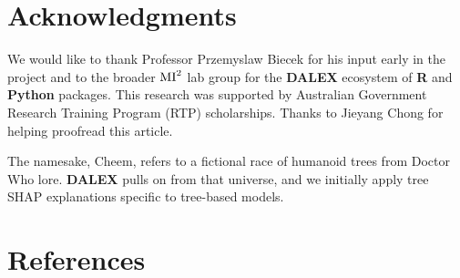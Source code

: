 \documentclass[
]{article}
\begin{document}
\hypertarget{acknowledgments}{%
\section{Acknowledgments}\label{acknowledgments}}

We would like to thank Professor Przemyslaw Biecek for his input early in the project and to the broader \(\text{MI}^\text2\) lab group for the \textbf{DALEX} ecosystem of \textbf{R} and \textbf{Python} packages. This research was supported by Australian Government Research Training Program (RTP) scholarships. Thanks to Jieyang Chong for helping proofread this article.

The namesake, Cheem, refers to a fictional race of humanoid trees from Doctor Who lore. \textbf{DALEX} pulls on from that universe, and we initially apply tree SHAP explanations specific to tree-based models.

\hypertarget{references}{%
\section*{References}\label{references}}
\end{document}
